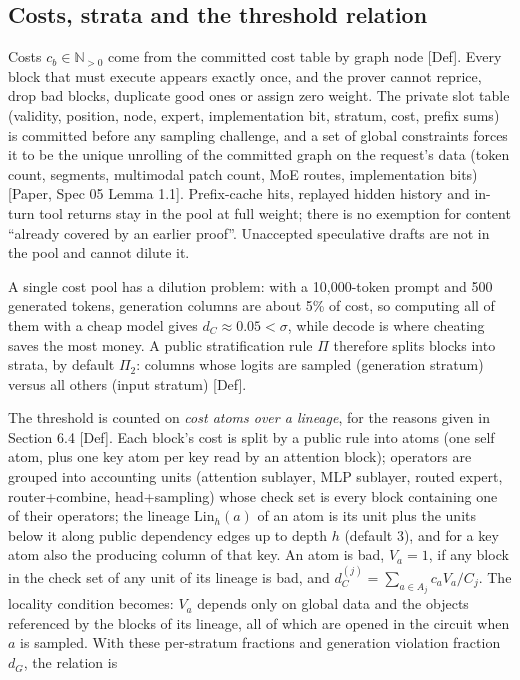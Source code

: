 \documentclass[10pt]{article}
\begin{document}
\subsection{Costs, strata and the threshold relation}
Costs $c_b\in\mathbb N_{>0}$ come from the committed cost table by graph node [Def]. Every block that must execute appears exactly once, and the prover cannot reprice, drop bad blocks, duplicate good ones or assign zero weight. The private slot table (validity, position, node, expert, implementation bit, stratum, cost, prefix sums) is committed before any sampling challenge, and a set of global constraints forces it to be the unique unrolling of the committed graph on the request's data (token count, segments, multimodal patch count, MoE routes, implementation bits) [Paper, Spec 05 Lemma 1.1]. Prefix-cache hits, replayed hidden history and in-turn tool returns stay in the pool at full weight; there is no exemption for content ``already covered by an earlier proof''. Unaccepted speculative drafts are not in the pool and cannot dilute it.

A single cost pool has a dilution problem: with a 10,000-token prompt and 500 generated tokens, generation columns are about 5\% of cost, so computing all of them with a cheap model gives $d_C\approx0.05<\sigma$, while decode is where cheating saves the most money. A public stratification rule $\Pi$ therefore splits blocks into strata, by default $\Pi_2$: columns whose logits are sampled (generation stratum) versus all others (input stratum) [Def].

The threshold is counted on \emph{cost atoms over a lineage}, for the reasons given in Section 6.4 [Def]. Each block's cost is split by a public rule into atoms (one self atom, plus one key atom per key read by an attention block); operators are grouped into accounting units (attention sublayer, MLP sublayer, routed expert, router+combine, head+sampling) whose check set is every block containing one of their operators; the lineage $\mathrm{Lin}_h(a)$ of an atom is its unit plus the units below it along public dependency edges up to depth $h$ (default 3), and for a key atom also the producing column of that key. An atom is bad, $V_a=1$, if any block in the check set of any unit of its lineage is bad, and $d^{(j)}_C=\sum_{a\in A_j}c_aV_a/C_j$. The locality condition becomes: $V_a$ depends only on global data and the objects referenced by the blocks of its lineage, all of which are opened in the circuit when $a$ is sampled. With these per-stratum fractions and generation violation fraction $d_G$, the relation is
\end{document}
